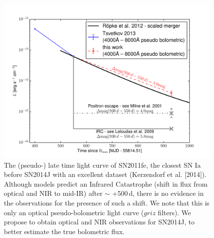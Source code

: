 \documentclass[11pt]{article}
\begin{document}
\begin{figure}
\includegraphics[width=\textwidth, trim=0 0 30 0]{sn11fe_bolom.pdf}
\caption{The (pseudo-) late time light curve of SN2011fe, the closest SN Ia before SN2014J with an excellent dataset (Kerzendorf et al. [2014]). Although models predict an Infrared Catastrophe (shift in flux from optical and NIR to mid-IR) after $\sim$ +500\,d, there is no evidence in the observations for the presence of such a shift. We note that this is only an optical pseudo-bolometric light curve ($griz$ filters). We propose to obtain optical and NIR observations for SN2014J, to better estimate the true bolometric flux.}%
\label{fig:11fe}
\end{figure}
\end{document}
